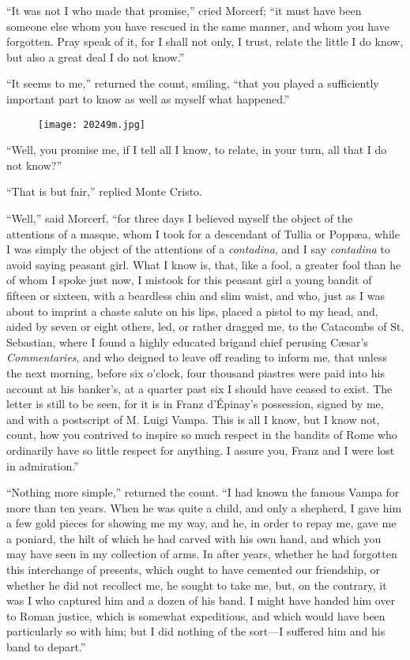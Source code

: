 “It was not I who made that promise,” cried Morcerf; “it must have been
someone else whom you have rescued in the same manner, and whom you
have forgotten. Pray speak of it, for I shall not only, I trust, relate
the little I do know, but also a great deal I do not know.”

“It seems to me,” returned the count, smiling, “that you played a
sufficiently important part to know as well as myself what happened.”

\begin{figure}[h]
\texttt{[image: 20249m.jpg]}
\end{figure}

“Well, you promise me, if I tell all I know, to relate, in your turn,
all that I do not know?”

“That is but fair,” replied Monte Cristo.

“Well,” said Morcerf, “for three days I believed myself the object of
the attentions of a masque, whom I took for a descendant of Tullia or
Poppæa, while I was simply the object of the attentions of a
\textit{contadina}, and I say \textit{contadina} to avoid saying peasant girl. What I
know is, that, like a fool, a greater fool than he of whom I spoke just
now, I mistook for this peasant girl a young bandit of fifteen or
sixteen, with a beardless chin and slim waist, and who, just as I was
about to imprint a chaste salute on his lips, placed a pistol to my
head, and, aided by seven or eight others, led, or rather dragged me,
to the Catacombs of St. Sebastian, where I found a highly educated
brigand chief perusing Cæsar’s \textit{Commentaries}, and who deigned to leave
off reading to inform me, that unless the next morning, before six
o’clock, four thousand piastres were paid into his account at his
banker’s, at a quarter past six I should have ceased to exist. The
letter is still to be seen, for it is in Franz d’Épinay’s possession,
signed by me, and with a postscript of M. Luigi Vampa. This is all I
know, but I know not, count, how you contrived to inspire so much
respect in the bandits of Rome who ordinarily have so little respect
for anything. I assure you, Franz and I were lost in admiration.”

“Nothing more simple,” returned the count. “I had known the famous
Vampa for more than ten years. When he was quite a child, and only a
shepherd, I gave him a few gold pieces for showing me my way, and he,
in order to repay me, gave me a poniard, the hilt of which he had
carved with his own hand, and which you may have seen in my collection
of arms. In after years, whether he had forgotten this interchange of
presents, which ought to have cemented our friendship, or whether he
did not recollect me, he sought to take me, but, on the contrary, it
was I who captured him and a dozen of his band. I might have handed him
over to Roman justice, which is somewhat expeditious, and which would
have been particularly so with him; but I did nothing of the sort—I
suffered him and his band to depart.”

